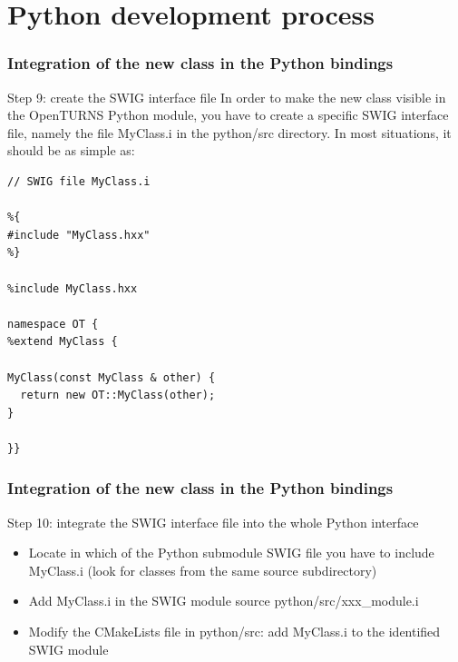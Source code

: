 \documentclass[8pt]{beamer}
\begin{document}
\section[Python development process]{Python development process}
\begin{frame}[fragile]
  \frametitle{Integration of the new class in the Python bindings}
  \begin{block}{Step 9: create the SWIG interface file}
    In order to make the new class visible in the OpenTURNS Python module, you have to create a specific SWIG interface file, namely the file MyClass.i in the python/src directory. In most situations, it should be as simple as:
    \small

    \begin{lstlisting}
// SWIG file MyClass.i

%{
#include "MyClass.hxx"
%}

%include MyClass.hxx

namespace OT {
%extend MyClass {

MyClass(const MyClass & other) {
  return new OT::MyClass(other);
}

}}
\end{lstlisting}
    
    \normalsize
  \end{block}
\end{frame}
\begin{frame}
  \frametitle{Integration of the new class in the Python bindings}
  \begin{block}{Step 10: integrate the SWIG interface file into the whole Python interface}
    \begin{itemize}
    \item Locate in which of the Python submodule SWIG file you have to include MyClass.i (look for classes from the same source subdirectory) 
    \item Add MyClass.i in the SWIG module source python/src/xxx\_module.i
    \item Modify the CMakeLists file in python/src: add MyClass.i to the identified SWIG module
    \end{itemize}
  \end{block}
\end{frame}
\end{document}

